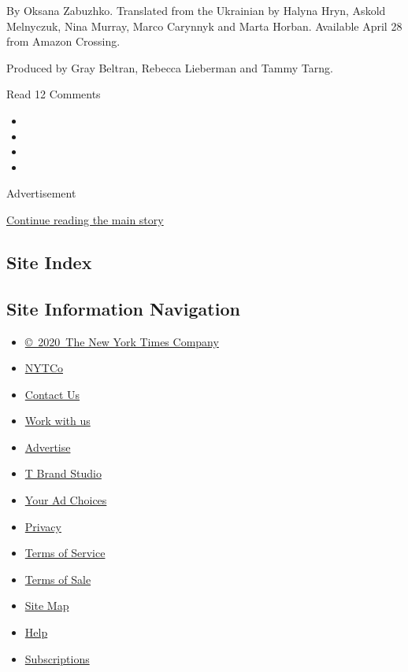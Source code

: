  By Oksana Zabuzhko. Translated from the Ukrainian by Halyna Hryn,
Askold Melnyczuk, Nina Murray, Marco Carynnyk and Marta Horban.
Available April 28 from Amazon Crossing.

Produced by Gray Beltran, Rebecca Lieberman and Tammy Tarng.

Read 12 Comments

\begin{itemize}
\item
\item
\item
\item
\end{itemize}

Advertisement

\protect\hyperlink{after-bottom}{Continue reading the main story}

\hypertarget{site-index}{%
\subsection{Site Index}\label{site-index}}

\hypertarget{site-information-navigation}{%
\subsection{Site Information
Navigation}\label{site-information-navigation}}

\begin{itemize}
\tightlist
\item
  \href{https://help.nytimes3xbfgragh.onion/hc/en-us/articles/115014792127-Copyright-notice}{©~2020~The
  New York Times Company}
\end{itemize}

\begin{itemize}
\tightlist
\item
  \href{https://www.nytco.com/}{NYTCo}
\item
  \href{https://help.nytimes3xbfgragh.onion/hc/en-us/articles/115015385887-Contact-Us}{Contact
  Us}
\item
  \href{https://www.nytco.com/careers/}{Work with us}
\item
  \href{https://nytmediakit.com/}{Advertise}
\item
  \href{http://www.tbrandstudio.com/}{T Brand Studio}
\item
  \href{https://www.nytimes3xbfgragh.onion/privacy/cookie-policy\#how-do-i-manage-trackers}{Your
  Ad Choices}
\item
  \href{https://www.nytimes3xbfgragh.onion/privacy}{Privacy}
\item
  \href{https://help.nytimes3xbfgragh.onion/hc/en-us/articles/115014893428-Terms-of-service}{Terms
  of Service}
\item
  \href{https://help.nytimes3xbfgragh.onion/hc/en-us/articles/115014893968-Terms-of-sale}{Terms
  of Sale}
\item
  \href{https://spiderbites.nytimes3xbfgragh.onion}{Site Map}
\item
  \href{https://help.nytimes3xbfgragh.onion/hc/en-us}{Help}
\item
  \href{https://www.nytimes3xbfgragh.onion/subscription?campaignId=37WXW}{Subscriptions}
\end{itemize}
